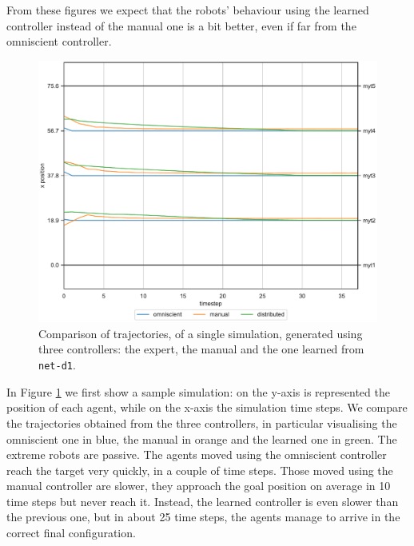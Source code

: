 From these figures we expect that the robots' behaviour using the learned 
controller instead of the manual one is a bit better, even if far from the omniscient 
controller.

\begin{figure}[!htb]
	\centering
	\includegraphics[width=.7\textwidth]{contents/images/net-d1/animation-distributed}%
	\caption[Evaluation of the trajectories obtained with \texttt{prox\_values} 
	input.]{Comparison of trajectories, of a single simulation, generated using three 
	controllers: the expert, the manual and the one learned from \texttt{net-d1}.}
	\label{fig:net-d1traj1}
\end{figure}
In Figure \ref{fig:net-d1traj1} we first show a sample simulation: on the y-axis is 
represented the position of each agent, while on the x-axis the simulation time 
steps. We compare the trajectories obtained from the three controllers, in 
particular visualising the omniscient one in blue, the manual in orange and the 
learned one in green.
The extreme robots are passive. The agents moved using the omniscient controller 
reach the target very quickly, in a couple of time steps. Those moved using the 
manual controller are slower, they approach the goal position on average in 10 
time steps but never reach it. Instead, the learned controller is even slower than 
the previous one, but in about 25 time steps, the agents manage to arrive in the 
correct final configuration. 

